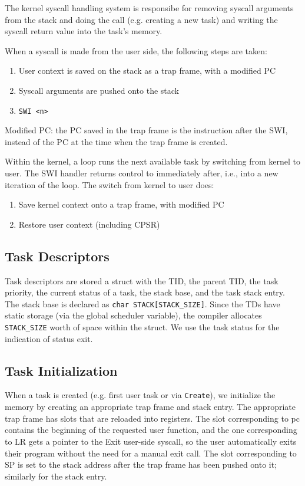 \documentclass{article}
\begin{document}
The kernel syscall handling system is responsibe for removing syscall arguments from the stack and doing the call (e.g. creating a new task) and writing the syscall return value into the task's memory.

When a syscall is made from the user side, the following steps are taken:

\begin{enumerate}
\item User context is saved on the stack as a trap frame, with a modified PC
\item Syscall arguments are pushed onto the stack
\item \texttt{SWI <n>}
\end{enumerate}

Modified PC: the PC saved in the trap frame is the instruction after the SWI, instead of the PC at the time when the trap frame is created.

Within the kernel, a loop runs the next available task by switching from kernel to user. The SWI handler returns control to immediately after, i.e., into a new iteration of the loop. The switch from kernel to user does:

\begin{enumerate}
\item Save kernel context onto a trap frame, with modified PC
\item Restore user context (including CPSR)
\end{enumerate}

\subsection*{Task Descriptors}

Task descriptors are stored a struct with the TID, the parent TID, the task priority, the current status of a task, the stack base, and the task stack entry. The stack base is declared as \texttt{char STACK[STACK\_SIZE]}. Since the TDs have static storage (via the global scheduler variable), the compiler allocates \texttt{STACK\_SIZE} worth of space within the struct. We use the task status for the indication of status exit.

\subsection*{Task Initialization}

When a task is created (e.g. first user task or via \texttt{Create}), we initialize the memory by creating an appropriate trap frame and stack entry. The appropriate trap frame has slots that are reloaded into registers. The slot corresponding to pc contains the beginning of the requested user function, and the one corresponding to LR gets a pointer to the Exit user-side syscall, so the user automatically exits their program without the need for a manual exit call. The slot corresponding to SP is set to the stack address after the trap frame has been pushed onto it; similarly for the stack entry.
\end{document}

